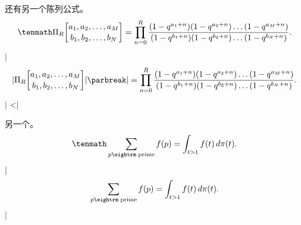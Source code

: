 \challenge 还有另一个陈列公式。 %
$$\tenmath \def\\#1#2{(1-q^{#1_#2+n})} %
\Pi_R{a_1,a_2,\ldots,a_M\atopwithdelims[]b_1,b_2,\ldots,b_N}
  =\prod_{n=0}^R{\\a1\\a2\ldots\\aM\over\\b1\\b2\ldots\\bN}.$$
\answer |$$\def\\#1#2{(1-q^{#1_#2+n})} %
        |\Pi_R{a_1,a_2,\ldots,a_M\atopwithdelims[]b_1,b_2,\ldots,b_N}|\parbreak
        |  =\prod_{n=0}^R{\\a1\\a2\ldots\\aM\over\\b1\\b2\ldots\\bN}.$$|
^^|\atopwithdelims|

\challenge 另一个。
$$\tenmath \sum_{p\rm\;prime}f(p)=\int_{t>1}f(t)\,d\pi(t).$$
\answer |$$\sum_{p\rm\;prime}f(p)=\int_{t>1}f(t)\,d\pi(t).$$|

